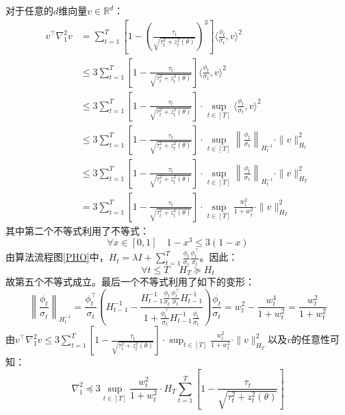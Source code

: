 \documentclass[UTF8,a4paper,10.5pt]{ctexart}
\newcommand{\R}{\mathbb{R}}
\begin{document}
对于任意的$d$维向量$v\in \R^d$：
\begin{align*}
	v^\top \nabla^2_1 v &= \sum_{t=1}^T\left[1-\left(\frac{\tau_t}{\sqrt{\tau_t^2 + z_t^2(\theta)}}\right)^3\right] \langle\frac{\phi_t}{\sigma_t},v \rangle^2 \\
	& \leq 3 \sum_{t=1}^T\left[1-\frac{\tau_t}{\sqrt{\tau_t^2 + z_t^2(\theta)}}\right] \langle\frac{\phi_t}{\sigma_t},v \rangle^2 \\
	& \leq 3 \sum_{t=1}^T\left[1-\frac{\tau_t}{\sqrt{\tau_t^2 + z_t^2(\theta)}}\right] \cdot \sup_{t\in [T]}\langle\frac{\phi_t}{\sigma_t},v \rangle^2 \\
	& \leq 3 \sum_{t=1}^T\left[1-\frac{\tau_t}{\sqrt{\tau_t^2 + z_t^2(\theta)}}\right] \cdot \sup_{t\in [T]}\left\|\frac{\phi_t}{\sigma_t}\right\|_{H_t^{-1}}\cdot \|v\|^2_{H_t} \\
	& \leq 3 \sum_{t=1}^T\left[1-\frac{\tau_t}{\sqrt{\tau_t^2 + z_t^2(\theta)}}\right] \cdot \sup_{t\in [T]}\left\|\frac{\phi_t}{\sigma_t}\right\|_{H_t^{-1}}\cdot \|v\|^2_{H_T} \\
	& = 3 \sum_{t=1}^T\left[1-\frac{\tau_t}{\sqrt{\tau_t^2 + z_t^2(\theta)}}\right] \cdot \sup_{t\in [T]} \frac{w_t^2}{1+w_t^2} \cdot \|v\|^2_{H_T}
\end{align*}
其中第二个不等式利用了不等式：
\begin{equation*}
	\forall x\in [0,1] \quad 1-x^3\leq 3(1-x)
\end{equation*}
由算法流程图\ref{PHO}中，$H_t = \lambda I + \sum_{t=1}^{T} \frac{\phi_t}{\sigma_t}\frac{\phi_t^\top}{\sigma_t}$。因此：
\begin{equation*}
	\forall t\leq T \quad H_T \succeq  H_t
\end{equation*}
故第五个不等式成立。最后一个不等式利用了如下的变形：
\begin{equation*}
	\left\|\frac{\phi_t}{\sigma_t}\right\|_{H_t^{-1}} = \frac{\phi_t^\top}{\sigma_t} \left(H_{t-1}^{-1} - \frac{H_{t-1}^{-1}\frac{\phi_t}{\sigma_t}\frac{\phi_t^\top}{\sigma_t} H_{t-1}^{-1}}{1+\frac{\phi_t^\top}{\sigma_t}H_{t-1}^{-1}\frac{\phi_t}{\sigma_t}} \right) \frac{\phi_t}{\sigma_t} = w_t^2 - \frac{w_t^4}{1+w_t^2} = \frac{w_t^2}{1+w_t^2}
\end{equation*}
由$v^\top \nabla^2_1 v \leq 3 \sum_{t=1}^T\left[1-\frac{\tau_t}{\sqrt{\tau_t^2 + z_t^2(\theta)}}\right] \cdot \sup_{t\in [T]} \frac{w_t^2}{1+w_t^2} \cdot \|v\|^2_{H_T}$以及$v$的任意性可知：
\begin{equation}
	\nabla^2_1 \preceq  3 \sup_{t\in [T]} \frac{w_t^2}{1+w_t^2} \cdot H_T \sum_{t=1}^T\left[1-\frac{\tau_t}{\sqrt{\tau_t^2 + z_t^2(\theta)}}\right] 
	\label{2p1 bound}
\end{equation}
\end{document}
